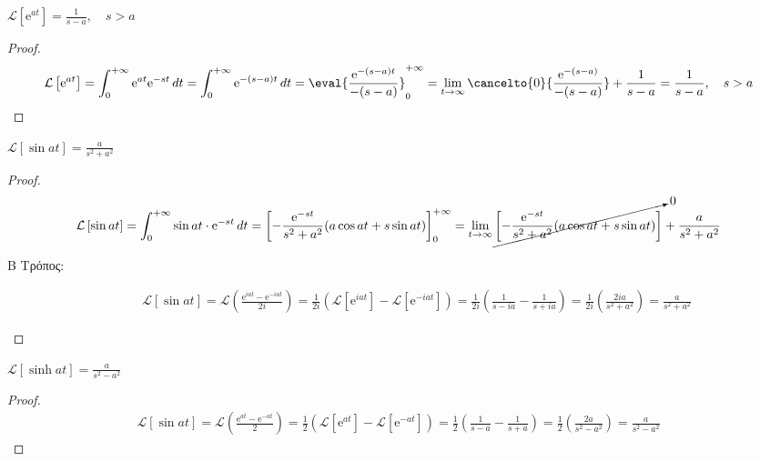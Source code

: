 \begin{example}
  $ \mathcal{L}\left[\mathrm{e}^{at}\right] = \frac{1}{s-a}, \quad s > a $ 
  \begin{proof}
    \[
      \mathcal{L}\left[\mathrm{e}^{at}\right] = \int_{0}^{+\infty} \mathrm{e}^{at} 
      \mathrm{e}^{-st} \,{dt} = \int_{0}^{+\infty} \mathrm{e}^{-(s-a)t} \,{dt} =
      \eval{\frac{\mathrm{e}^{-(s-a)t}}{-(s-a)}} _{0}^{+\infty} = 
      \lim_{t \to \infty} \cancelto{0}{\frac{\mathrm{e}^{-(s-a)}}{-(s-a)}}
      + \frac{1}{s-a} = \frac{1}{s-a}, \quad s > a
    \]
  \end{proof}
\end{example}

\begin{example}
  $ \mathcal{L}\left[\sin{at}\right] = \frac{a}{s^{2}+a^{2}} $
\end{example}
\begin{proof}
  \begin{align*}
    \mathcal{L}\left[\sin{at}\right] &= \int_{0}^{+\infty} \sin{at} \cdot
    \mathrm{e}^{-st} \,{dt} = \left[- \frac{\mathrm{e}^{-st}}{s^{2}+a^{2}} 
    (a \cos{at} + s \sin{at})\right] _{0}^{+\infty} = \lim_{t \to \infty} 
    \cancelto{0}{\left[- \frac{\mathrm{e}^{-st}}{s^{2}+a^{2}} (a \cos{at} + s
    \sin{at})\right]} + \frac{a}{s^{2}+a^{2}} \\
  \end{align*} 
  \begin{description}
    \item [Β Τρόπος:]
      \begin{align*}
        \mathcal{L}\left[\sin{at}\right] = \mathcal{L}\left(\frac{\mathrm{e}^{iat} -
        \mathrm{e}^{-iat}}{2i}\right) = \frac{1}{2i} 
        \left(\mathcal{L}[\mathrm{e}^{iat}] - \mathcal{L}[\mathrm{e}^{-iat}]\right) = 
        \frac{1}{2i} \left(\frac{1}{s-ia} - \frac{1}{s+ia}\right) = 
        \frac{1}{2i} \left(\frac{2ia}{s^{2}+a^{2}}\right) = \frac{a}{s^{2}+a^{2}}
      \end{align*}
  \end{description}
\end{proof}

\begin{example}
  $ \mathcal{L}\left[\sinh{at}\right] = \frac{a}{s^{2}-a^{2}} $
\end{example}
\begin{proof}
  \begin{align*}
    \mathcal{L}\left[\sin{at}\right] = \mathcal{L}\left(\frac{\mathrm{e}^{at} -
    \mathrm{e}^{-at}}{2}\right) = \frac{1}{2} 
    \left(\mathcal{L}[\mathrm{e}^{at}] - \mathcal{L}[\mathrm{e}^{-at}]\right) = 
    \frac{1}{2} \left(\frac{1}{s-a} - \frac{1}{s+a}\right) = 
    \frac{1}{2} \left(\frac{2a}{s^{2}-a^{2}}\right) = \frac{a}{s^{2}-a^{2}}
  \end{align*}
\end{proof}


